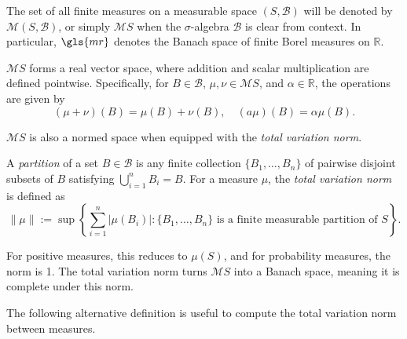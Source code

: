 The set of all finite measures on a measurable space $(S, \mathcal{B})$ will be denoted by $\mathcal{M}(S, \mathcal{B})$, 
or simply $\mathcal{M}S$ when the $\sigma$-algebra $\mathcal{B}$ is clear from context. In particular, $\gls{mr}$ denotes  the Banach space of finite Borel measures on $\mathbb{R}$.

 $\mathcal{M}S $ forms a real vector space, where addition and scalar multiplication are defined pointwise. Specifically, for  $ B \in \mathcal{B} $, $ \mu, \nu \in \mathcal{M}S $, and $ \alpha \in \mathbb{R} $, the operations are given by
$$
(\mu + \nu)(B) = \mu(B) + \nu(B), \quad (a\mu)(B) = \alpha \mu(B).
$$


\( \mathcal{M}S \) is also a normed space when equipped with the \emph{total variation norm}. 

\begin{definition} \label{def:tvnorm}
  A \emph{partition} of a set \( B \in \mathcal{B} \) is any finite collection \( \{B_1, \dots, B_n\} \) of pairwise disjoint subsets of \( B \) satisfying \( \bigcup_{i=1}^{n} B_i = B \). For a measure \( \mu \), the \emph{total variation norm} is defined as
$$
\|\mu\| := \sup \left\{ \sum_{i=1}^n |\mu(B_i)| : \{B_1, \dots, B_n\} \text{ is a finite measurable partition of } S \right\}.
$$
\end{definition}

For positive measures, this reduces to \( \mu(S) \), and for probability measures, the norm is 1. The total variation norm turns \( \mathcal{M}S \) into a Banach space, meaning it is complete under this norm. 

The following alternative definition is useful to compute the total variation norm between measures.

